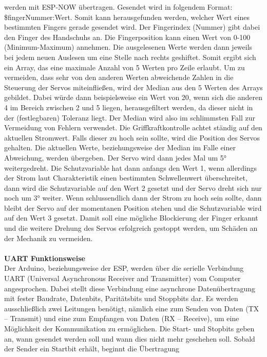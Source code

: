 \documentclass[titlepage,12pt,twoside]{article}
\begin{document}
werden mit ESP-NOW übertragen. Gesendet wird in folgendem Format: 
\$fingerNummer:Wert. Somit kann herausgefunden werden, welcher Wert eines 
bestimmten Fingers gerade gesendet wird. Der Fingerindex (Nummer) gibt dabei den 
Finger des Handschuhs an. Die Fingerposition kann einen Wert von 0-100 
(Minimum-Maximum) annehmen. Die ausgelesenen Werte werden dann jeweils bei jedem 
neuen Auslesen um eine Stelle nach rechts geshiftet. Somit ergibt sich ein Array, 
das eine maximale Anzahl von 5 Werten pro Zeile erlaubt. Um zu vermeiden, dass 
sehr von den anderen Werten abweichende Zahlen in die Steuerung der Servos miteinfließen, 
wird der Median aus den 5 Werten des Arrays gebildet. Dabei würde dann beispielsweise 
ein Wert von 20, wenn sich die anderen 4 im Bereich zwischen 2 und 5 liegen, 
herausgefiltert werden, da dieser nicht in der (festlegbaren) Toleranz liegt. 
Der Median wird also im schlimmsten Fall zur Vermeidung von Fehlern verwendet. 
Die Griffkraftkontrolle achtet ständig auf den aktuellen Stromwert. Falls dieser 
zu hoch sein sollte, wird die Position des Servos gehalten. Die aktuellen Werte, 
beziehungsweise der Median im Falle einer Abweichung, werden übergeben. Der 
Servo wird dann jedes Mal um 5° weitergedreht. Die Schutzvariable hat dann anfangs 
den Wert 1, wenn allerdings der Strom laut Charakteristik einen bestimmten Schwellenwert 
überschreitet, dann wird die Schutzvariable auf den Wert 2 gesetzt und der Servo 
dreht sich nur noch um 3° weiter. Wenn schlussendlich dann der Strom zu hoch sein 
sollte, dann bleibt der Servo auf der momentanen Position stehen und die Schutzvariable 
wird auf den Wert 3 gesetzt. Damit soll eine mögliche Blockierung der Finger 
erkannt und die weitere Drehung des Servos erfolgreich gestoppt werden, um 
Schäden an der Mechanik zu vermeiden. \\
\\
\textbf{UART Funktionsweise}
\\
Der Arduino, beziehungsweise der ESP, werden über die serielle Verbindung UART 
(Universal Asynchronous Receiver and Transmitter) vom Computer angesprochen. 
Dabei stellt diese Verbindung eine asynchrone Datenübertragung mit fester Baudrate, 
Datenbits, Paritätsbits und Stoppbits dar. Es werden ausschließlich zwei Leitungen 
benötigt, nämlich eine zum Senden von Daten (TX – Transmit) und eine zum Empfangen 
von Daten (RX – Receive), um eine Möglichkeit der Kommunikation zu ermöglichen. 
Die Start- und Stopbits geben an, wann gesendet werden soll und wann dies nicht 
mehr geschehen soll. Sobald der Sender ein Startbit erhält, beginnt die Übertragung 
\end{document}
